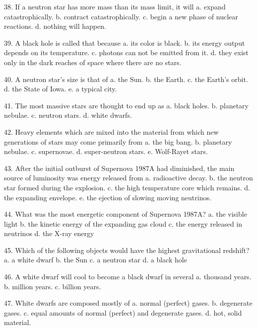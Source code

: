   38. If a neutron star has more mass than its mass limit, it will
      a.  expand catastrophically.
      b.  contract catastrophically.
      c.  begin a new phase of nuclear reactions.
      d.  nothing will happen.
      
  39. A black hole is called that because
      a.  its color is black.
      b.  its energy output depends on its temperature.
      c.  photons can not be emitted from it.
      d.  they exist only in the dark reaches of space where there
          are no stars.
      
  40. A neutron star's size is that of
      a.  the Sun.
      b.  the Earth.
      c.  the Earth's orbit.
      d.  the State of Iowa.
      e.  a typical city.
      
  41. The most massive stars are thought to end up as
      a.  black holes.
      b.  planetary nebulae.
      c.  neutron stars.
      d.  white dwarfs.
      
 
  42. Heavy elements which are mixed into the material from which
      new generations of stars may come primarily from
      a.  the big bang.
      b.  planetary nebulae.
      c.  supernovae.
      d.  super-neutron stars.
      e.  Wolf-Rayet stars.
      
 
  43. After the initial outburst of Supernova 1987A had diminished,
      the main source of luminosity was energy released from
      a.  radioactive decay.
      b.  the neutron star formed during the explosion.
      c.  the high temperature core which remains.
      d.  the expanding envelope.
      e.  the ejection of slowing moving neutrinos.
      
  44. What was the most energetic component of Supernova 1987A?
      a.  the visible light
      b.  the kinetic energy of the expanding gas cloud
      c.  the energy released in neutrinos
      d.  the X-ray energy
      
  45. Which of the following objects would have the highest
      gravitational redshift?
      a.  a white dwarf
      b.  the Sun
      c.  a neutron star
      d.  a black hole
      
  46. A white dwarf will cool to become a black dwarf in several
      a.  thousand years.
      b.  million years.
      c.  billion years.
      
  47. White dwarfs are composed mostly of
      a.  normal (perfect) gases.
      b.  degenerate gases.
      c.  equal amounts of normal (perfect) and degenerate gases.
      d.  hot, solid material.
      
